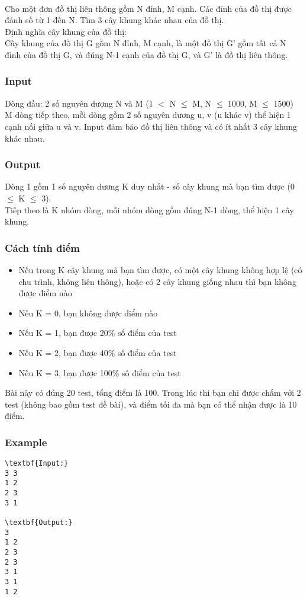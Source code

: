 

 

Cho một đơn đồ thị liên thông gồm N đỉnh, M cạnh. Các đỉnh của đồ thị được đánh số từ 1 đến N. Tìm 3 cây khung khác nhau của đồ thị.
\\Định nghĩa cây khung của đồ thị:
\\Cây khung của đồ thị G gồm N đỉnh, M cạnh, là một đồ thị G’ gồm tất cả N đỉnh của đồ thị G, và đúng N-1 cạnh của đồ thị G, và G’ là đồ thị liên thông.

\subsubsection{Input}

Dòng đầu: 2 số nguyên dương N và M (1 $<$ N  $\le$  M, N  $\le$  1000, M  $\le$  1500)
\\M dòng tiếp theo, mỗi dòng gồm 2 số nguyên dương u, v (u khác v) thể hiện 1 cạnh nối giữa u và v. Input đảm bảo đồ thị liên thông và có ít nhất 3 cây khung khác nhau.

\subsubsection{Output}

Dòng 1 gồm 1 số nguyên dương K duy nhất - số cây khung mà bạn tìm được (0  $\le$  K  $\le$  3).
\\Tiếp theo là K nhóm dòng, mỗi nhóm dòng gồm đúng N-1 dòng, thể hiện 1 cây khung.

\subsubsection{Cách tính điểm}
\begin{itemize}
	\item Nếu trong K cây khung mà bạn tìm được, có một cây khung không hợp lệ (có chu trình, không liên thông), hoặc có 2 cây khung giống nhau thì bạn không được điểm nào
	\item Nếu K = 0, bạn không được điểm nào
	\item Nếu K = 1, bạn được 20\% số điểm của test
	\item Nếu K = 2, bạn được 40\% số điểm của test
	\item Nếu K = 3, bạn được 100\% số điểm của test
\end{itemize}

Bài này có đúng 20 test, tổng điểm là 100. Trong lúc thi bạn chỉ được chấm với 2 test (không bao gồm test đề bài), và điểm tối đa mà bạn có thể nhận được là 10 điểm.

\subsubsection{Example}
\begin{verbatim}
\textbf{Input:}
3 3
1 2
2 3
3 1

\textbf{Output:}
3
1 2
2 3
2 3
3 1
3 1
1 2\end{verbatim}
